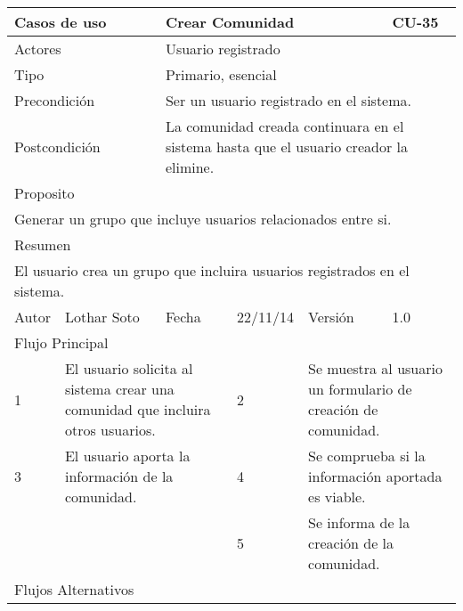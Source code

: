 \documentclass{article}
\begin{document}
\begin{table}[h]
\begin{tabular}{|l|l|l|l|l|l|}
\hline
\multicolumn{2}{|p{2cm}|}{Casos de uso}  & \multicolumn{3}{p{7cm}|}{Crear Comunidad} & CU-35 \\
\hline
\multicolumn{2}{|p{2cm}|}{Actores}       & \multicolumn{4}{p{8cm}|}{Usuario registrado}        \\
\hline
\multicolumn{2}{|p{2cm}|}{Tipo}          & \multicolumn{4}{p{8cm}|}{Primario, esencial}        \\
\hline
\multicolumn{2}{|p{2cm}|}{Precondición}  & \multicolumn{4}{p{8cm}|}{Ser un usuario registrado en el sistema.}        \\
\hline
\multicolumn{2}{|p{2cm}|}{Postcondición} & \multicolumn{4}{p{8cm}|}{La comunidad creada continuara en el sistema hasta que el usuario creador la elimine.}        \\
\hline
\multicolumn{6}{|p{10cm}|}{Proposito}                                   \\
\hline
\multicolumn{6}{|p{10cm}|}{Generar un grupo que incluye usuarios relacionados entre si.}                                            \\
\hline
\multicolumn{6}{|p{10cm}|}{Resumen}                                 \\
\hline
\multicolumn{6}{|p{10cm}|}{El usuario crea un grupo que incluira usuarios registrados en el sistema.}                                            \\
\hline
Autor         &       Lothar Soto        &  Fecha   &  22/11/14   &   Versión  & 1.0\\
\hline
\multicolumn{6}{|p{10cm}|}{Flujo Principal}\\
\hline
\multicolumn{1}{|p{1cm}|}{1} & \multicolumn{2}{p{3cm}}{El usuario solicita al sistema crear una comunidad que incluira otros usuarios.} & \multicolumn{1}{|p{1cm}|}{2} & \multicolumn{2}{p{3cm}|}{Se muestra al usuario un formulario de creación de comunidad.}\\
\hline
\multicolumn{1}{|p{1cm}|}{3} & \multicolumn{2}{p{3cm}}{El usuario aporta la información de la comunidad.} & \multicolumn{1}{|p{1cm}|}{4} & \multicolumn{2}{p{3cm}|}{Se comprueba si la información aportada es viable.}\\
\hline
\multicolumn{1}{|p{1cm}|}{} & \multicolumn{2}{p{3cm}}{} & \multicolumn{1}{|p{1cm}|}{5} & \multicolumn{2}{p{3cm}|}{Se informa de la creación de la comunidad.}\\
\hline
\multicolumn{6}{|p{10cm}|}{Flujos Alternativos}\\

\end{tabular}
\end{table}
\end{document}
